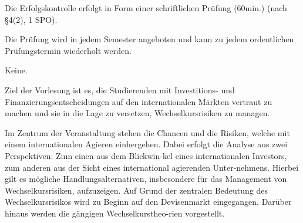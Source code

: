 \begin{course}

\setdoclanguagegerman
{}



\coursehead


\label{cour_6447.dp_997}


\begin{styleenv}
\begin{assessment}
Die Erfolgskontrolle erfolgt in Form einer schriftlichen Prüfung (60min.) (nach §4(2), 1 SPO).

 

Die Prüfung wird in jedem Semester angeboten und kann zu jedem ordentlichen Prüfungstermin wiederholt werden.


\end{assessment}

\begin{conditions}Keine.\end{conditions}


\end{styleenv}

\begin{learningoutcomes}
Ziel der Vorlesung ist es, die Studierenden mit Investitions- und Finanzierungsentscheidungen auf den internationalen Märkten vertraut zu machen und sie in die Lage zu versetzen, Wechselkursrisiken zu managen.


\end{learningoutcomes}

\begin{content}
Im Zentrum der Veranstaltung stehen die Chancen und die Risiken, welche mit einem internationalen Agieren einhergehen. Dabei erfolgt die Analyse aus zwei Perspektiven: Zum einen aus dem Blickwin-kel eines internationalen Investors, zum anderen aus der Sicht eines international agierenden Unter-nehmens. Hierbei gilt es mögliche Handlungsalternativen, insbesondere für das Management von Wechselkursrisiken, aufzuzeigen. Auf Grund der zentralen Bedeutung des Wechselkursrisikos wird zu Beginn auf den Devisenmarkt eingegangen. Darüber hinaus werden die gängigen Wechselkurstheo-rien vorgestellt.



\end{content}
\end{course}
